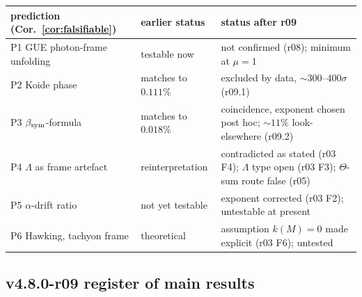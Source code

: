 \begin{center}
\small
\begin{tabular}{@{}>{\raggedright\arraybackslash}p{}>{\raggedright\arraybackslash}p{}>{\raggedright\arraybackslash}p{}@{}}
\toprule
prediction (Cor.~\ref{cor:falsifiable}) & earlier status & status after r09\\
\midrule
P1 GUE photon-frame unfolding & testable now & not confirmed (r08); minimum at \(\mu=1\)\\
P2 Koide phase & matches to \(0.111\%\) & excluded by data, \(\sim300\)--\(400\sigma\) (r09.1)\\
P3 \(\beta_{\mathrm{sym}}\)-formula & matches to \(0.018\%\) & coincidence, exponent chosen post hoc; \(\sim11\%\) look-elsewhere (r09.2)\\
P4 \(\Lambda\) as frame artefact & reinterpretation & contradicted as stated (r03 F4); \(\Lambda\) type open (r03 F3); \(\Theta\)-sum route false (r05)\\
P5 \(\alpha\)-drift ratio & not yet testable & exponent corrected (r03 F2); untestable at present\\
P6 Hawking, tachyon frame & theoretical & assumption \(k(M)=0\) made explicit (r03 F6); untested\\
\bottomrule
\end{tabular}
\end{center}

\subsection*{v4.8.0-r09 register of main results}
\label{subsec:v480-r09-results}

